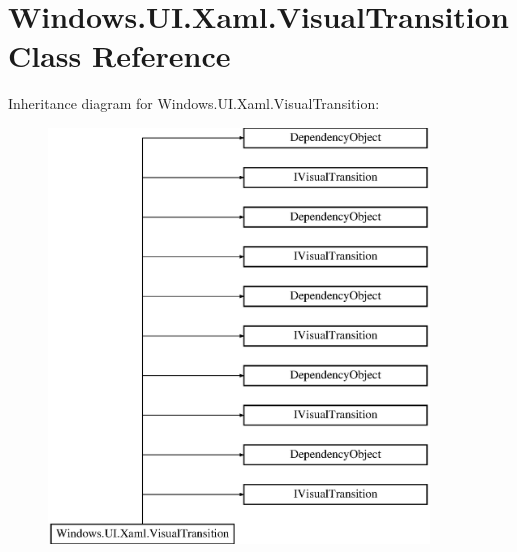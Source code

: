 \hypertarget{class_windows_1_1_u_i_1_1_xaml_1_1_visual_transition}{}\section{Windows.\+U\+I.\+Xaml.\+Visual\+Transition Class Reference}
\label{class_windows_1_1_u_i_1_1_xaml_1_1_visual_transition}
Inheritance diagram for Windows.\+U\+I.\+Xaml.\+Visual\+Transition\+:\begin{figure}[H]
\begin{center}
\leavevmode
\includegraphics[height=11.000000cm]{class_windows_1_1_u_i_1_1_xaml_1_1_visual_transition}
\end{center}
\end{figure}
